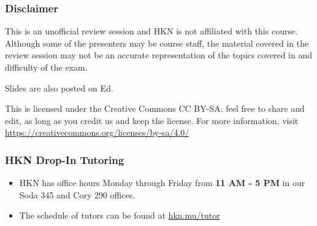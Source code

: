 \providecommand{\SlideAccessingLogistics}{\textless Insert piazza post number here \textgreater}
\providecommand{\SlidesLocation}{\textless Slides location and/or link \textgreater}
\providecommand{\PresenterHours}{\textless Itemize the presenter hours here \textgreater}

\begin{frame}

\titlepage

\end{frame}

\begin{frame}[t]\vspace{20pt}
\frametitle{Disclaimer}
This is an unofficial review session and HKN is not affiliated with this course. Although some of the presenters may be course staff, the material covered in the review session may not be an accurate representation of the topics covered in and difficulty of the exam.


Slides are also posted on Ed.

\begin{footnotesize}
  This is licensed under the Creative Commons CC BY-SA: feel free to share and edit, as long as you credit us and keep the license. For more information, visit
  \href{https://creativecommons.org/licenses/by-sa/4.0/}{https://creativecommons.org/licenses/by-sa/4.0/}
\end{footnotesize}

\vspace{20pt}

\end{frame}


\begin{frame}[t]\vspace{20pt}
\frametitle{HKN Drop-In Tutoring}

\begin{itemize}
  \item HKN has office hours Monday through Friday from \textbf{11 AM - 5 PM} in our Soda 345 and Cory 290 offices.
  \item The schedule of tutors can be found at \href{https://hkn.mu/tutor}{hkn.mu/tutor}
\end{itemize}

\end{frame}
